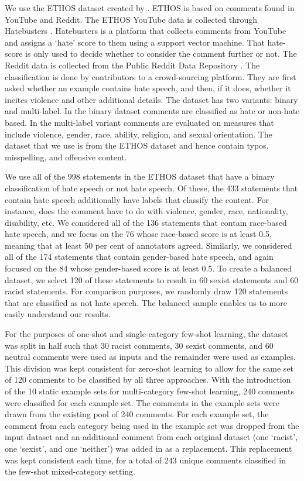 \documentclass{bmcart}
\begin{document}
We use the ETHOS dataset created by \cite{mollas2020ethos}. ETHOS is based on comments found in YouTube and Reddit. The ETHOS YouTube data is collected through Hatebusters \cite{anagnostou2018hatebusters}. Hatebusters is a platform that collects comments from YouTube and assigns a `hate' score to them using a support vector machine. That hate-score is only used to decide whether to consider the comment further or not. The Reddit data is collected from the Public Reddit Data Repository \cite{baumgartner2020pushshift}. The classification is done by contributors to a crowd-sourcing platform. They are first asked whether an example contains hate speech, and then, if it does, whether it incites violence and other additional details. The dataset has two variants: binary and multi-label. In the binary dataset comments are classified as hate or non-hate based. In the multi-label variant comments are evaluated on measures that include violence, gender, race, ability, religion, and sexual orientation. The dataset that we use is from the ETHOS dataset and hence contain typos, misspelling, and offensive content.

We use all of the 998 statements in the ETHOS dataset that have a binary classification of hate speech or not hate speech. Of these, the 433 statements that contain hate speech additionally have labels that classify the content. For instance, does the comment have to do with violence, gender, race, nationality, disability, etc. We considered all of the 136 statements that contain race-based hate speech, and we focus on the 76 whose race-based score is at least 0.5, meaning that at least 50 per cent of annotators agreed. Similarly, we considered all of the 174 statements that contain gender-based hate speech, and again focused on the 84 whose gender-based score is at least 0.5. To create a balanced dataset, we select 120 of these statements to result in 60 sexist statements and 60 racist statements. For comparison purposes, we randomly draw 120 statements that are classified as not hate speech. The balanced sample enables us to more easily understand our results.

For the purposes of one-shot and single-category few-shot learning, the dataset was split in half such that 30 racist comments, 30 sexist comments, and 60 neutral comments were used as inputs and the remainder were used as examples. This division was kept consistent for zero-shot learning to allow for the same set of 120 comments to be classified by all three approaches. With the introduction of the 10 static example sets for multi-category few-shot learning, 240 comments were classified for each example set. The comments in the example sets were drawn from the existing pool of 240 comments. For each example set, the comment from each category being used in the example set was dropped from the input dataset and an additional comment from each original dataset (one `racist', one `sexist', and one `neither') was added in as a replacement. This replacement was kept consistent each time, for a total of 243 unique comments classified in the few-shot mixed-category setting.
\end{document}
